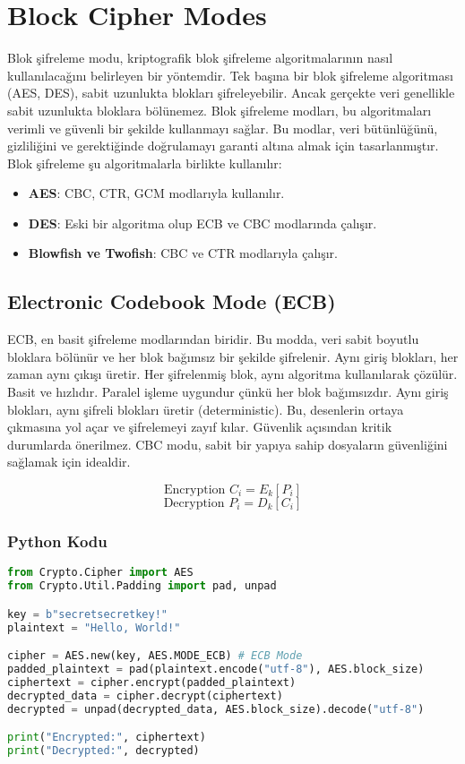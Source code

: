 \section{Block Cipher Modes}

Blok şifreleme modu, kriptografik blok şifreleme algoritmalarının nasıl kullanılacağını belirleyen bir yöntemdir. Tek başına bir blok şifreleme algoritması (AES, DES), sabit uzunlukta blokları şifreleyebilir. Ancak gerçekte veri genellikle sabit uzunlukta bloklara bölünemez. Blok şifreleme modları, bu algoritmaları verimli ve güvenli bir şekilde kullanmayı sağlar. Bu modlar, veri bütünlüğünü, gizliliğini ve gerektiğinde doğrulamayı garanti altına almak için tasarlanmıştır. Blok şifreleme şu algoritmalarla birlikte kullanılır:

\begin{itemize}
    \item \textbf{AES}: CBC, CTR, GCM modlarıyla kullanılır.
    \item \textbf{DES}: Eski bir algoritma olup ECB ve CBC modlarında çalışır.
    \item \textbf{Blowfish ve Twofish}: CBC ve CTR modlarıyla çalışır.
\end{itemize}

\newpage

\subsection{Electronic Codebook Mode (ECB)}

ECB, en basit şifreleme modlarından biridir. Bu modda, veri sabit boyutlu bloklara bölünür ve her blok bağımsız bir şekilde şifrelenir. Aynı giriş blokları, her zaman aynı çıkışı üretir. Her şifrelenmiş blok, aynı algoritma kullanılarak çözülür. Basit ve hızlıdır. Paralel işleme uygundur çünkü her blok bağımsızdır. Aynı giriş blokları, aynı şifreli blokları üretir (deterministic). Bu, desenlerin ortaya çıkmasına yol açar ve şifrelemeyi zayıf kılar. Güvenlik açısından kritik durumlarda önerilmez. CBC modu, sabit bir yapıya sahip dosyaların güvenliğini sağlamak için idealdir.

\[ \text{Encryption } C_i = E_k [P_i] \]
\[ \text{Decryption } P_i = D_k [C_i] \]

\subsubsection{Python Kodu}

\begin{lstlisting}[language=Python]
from Crypto.Cipher import AES
from Crypto.Util.Padding import pad, unpad

key = b"secretsecretkey!"
plaintext = "Hello, World!"

cipher = AES.new(key, AES.MODE_ECB) # ECB Mode
padded_plaintext = pad(plaintext.encode("utf-8"), AES.block_size)
ciphertext = cipher.encrypt(padded_plaintext)
decrypted_data = cipher.decrypt(ciphertext)
decrypted = unpad(decrypted_data, AES.block_size).decode("utf-8")

print("Encrypted:", ciphertext)
print("Decrypted:", decrypted)
\end{lstlisting}

